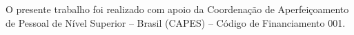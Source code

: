 

\imprimircapa%
\imprimirfolhaderosto*




\begin{agradecimentos}
  O presente trabalho foi realizado com apoio da Coordenação de Aperfeiçoamento de Pessoal de Nível Superior -- Brasil (CAPES) -- Código de Financiamento 001.
\end{agradecimentos}





